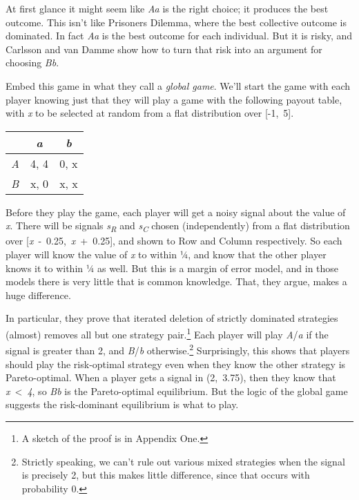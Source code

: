 \documentclass[
  10pt,
  letterpaper,
  DIV=11,
  numbers=noendperiod,
  twoside]{scrartcl}
\begin{document}
At first glance it might seem like \emph{Aa} is the right choice; it
produces the best outcome. This isn't like Prisoners Dilemma, where the
best collective outcome is dominated. In fact \emph{Aa} is the best
outcome for each individual. But it is risky, and Carlsson and van Damme
show how to turn that risk into an argument for choosing \emph{Bb}.

Embed this game in what they call a \emph{global game}. We'll start the
game with each player knowing just that they will play a game with the
following payout table, with \emph{x} to be selected at random from a
flat distribution over {[}-1,~5{]}.

\begin{longtable}[]{@{}lcc@{}}
\toprule\noalign{}
& \emph{a} & \emph{b} \\
\midrule\noalign{}
\endhead
\bottomrule\noalign{}
\endlastfoot
\emph{A} & 4, 4 & 0, x \\
\emph{B} & x, 0 & x, x \\
\end{longtable}

Before they play the game, each player will get a noisy signal about the
value of \emph{x}. There will be signals \emph{s\textsubscript{R}} and
\emph{s\textsubscript{C}} chosen (independently) from a flat
distribution over {[}\emph{x}~-~0.25,~\emph{x}~+~0.25{]}, and shown to
Row and Column respectively. So each player will know the value of
\emph{x} to within ¼, and know that the other player knows it to within
¼ as well. But this is a margin of error model, and in those models
there is very little that is common knowledge. That, they argue, makes a
huge difference.

In particular, they prove that iterated deletion of strictly dominated
strategies (almost) removes all but one strategy pair.\footnote{A sketch
  of the proof is in Appendix One.} Each player will play
\emph{A}/\emph{a} if the signal is greater than 2, and \emph{B}/\emph{b}
otherwise.\footnote{Strictly speaking, we can't rule out various mixed
  strategies when the signal is precisely 2, but this makes little
  difference, since that occurs with probability 0.} Surprisingly, this
shows that players should play the risk-optimal strategy even when they
know the other strategy is Pareto-optimal. When a player gets a signal
in (2,~3.75), then they know that \emph{x}~\textless~\emph{4}, so
\emph{Bb} is the Pareto-optimal equilibrium. But the logic of the global
game suggests the risk-dominant equilibrium is what to play.
\end{document}
